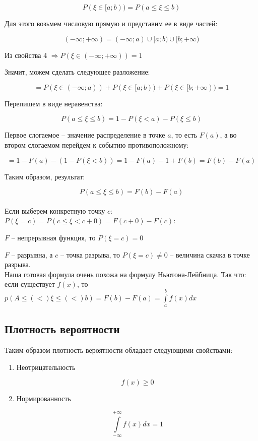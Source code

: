 \documentclass{article}
\begin{document}
$$P(\xi \in [a; b)) = P(a \leq \xi \leq b)$$

Для этого возьмем числовую прямую и представим ее в виде частей:

$$(-\infty; +\infty) = (-\infty; a)\cup[a; b)\cup[b; +\infty)$$

Из свойства 4 $\Rightarrow P(\xi \in (-\infty; +\infty)) = 1$

Значит, можем сделать следующее разложение:

$$= P(\xi \in (-\infty; a)) + P(\xi \in [a; b)) + P(\xi \in [b; +\infty)) = 1$$

Перепишем в виде неравенства:

$$ P(a \leq \xi \leq b) = 1 - P(\xi < a) - P(\xi \leq b)$$

Первое слогаемое -- значение распределение в точке $a$, то есть $F(a)$, а во втором слогаемом перейдем к событию противоположному:

$$ = 1 - F(a) - (1 - P(\xi < b)) = 1 - F(a) - 1 + F(b) = F(b) - F(a)$$

Таким образом, результат:

$$ P(a \leq \xi \leq b) = F(b) - F(a)$$
\\


Если выберем конкретную точку $c$: $P(\xi = c) = P(c \leq \xi < c + 0) = F(c + 0) - F(c)$:

 $F$ -- непрерывная функция, то $P(\xi = c) = 0$

 $F$ -- разрывна, а $c$ -- точка разрыва, то $P(\xi = c) \not= 0$ -- величина скачка в точке разрыва.
\\

Наша готовая формула очень похожа на формулу Ньютона-Лейбница. Так что:
если существует $f(x)$, то $p(A \leq (<) \xi \leq (<) b) = F(b) - F(a) = \int\limits_a^b f(x)dx$

\subsection{Плотность вероятности}

Таким образом плотность вероятности обладает следующими свойствами:

\begin{enumerate}
\item Неотрицательность

$$ f(x) \geq 0$$

\item Нормированность

$$ \int\limits_{-\infty}^{+\infty}f(x)dx = 1$$

\end{enumerate}
\end{document}
